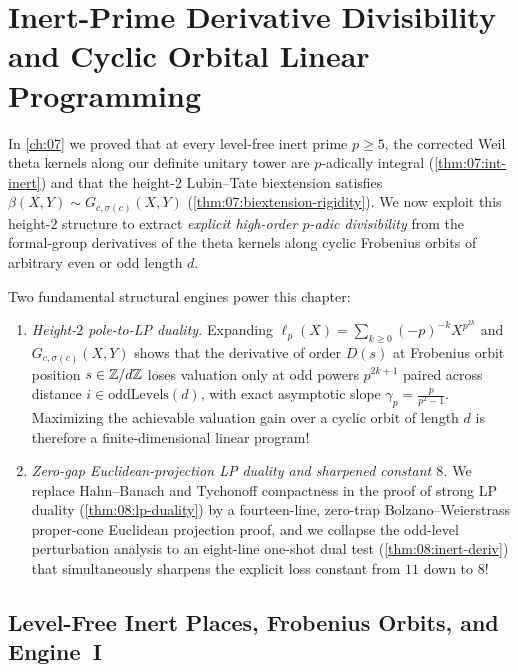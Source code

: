 \chapter{Inert-Prime Derivative Divisibility and Cyclic Orbital Linear Programming}
\label{ch:08}

In \cref{ch:07} we proved that at every level-free inert prime $p \ge 5$, the corrected Weil theta kernels along our definite unitary tower are $p$-adically integral (\cref{thm:07:int-inert}) and that the height-$2$ Lubin--Tate biextension satisfies $\beta(X, Y) \sim G_{c, \sigma(c)}(X, Y)$ (\cref{thm:07:biextension-rigidity}). We now exploit this height-$2$ structure to extract \emph{explicit high-order $p$-adic divisibility} from the formal-group derivatives of the theta kernels along cyclic Frobenius orbits of arbitrary even or odd length $d$.

Two fundamental structural engines power this chapter:
\begin{enumerate}[label=(\roman*)]
\item \emph{Height-$2$ pole-to-LP duality.} Expanding $\ell_p(X) = \sum_{k \ge 0} (-p)^{-k} X^{p^{2k}}$ and $G_{c,\sigma(c)}(X, Y)$ shows that the derivative of order $D(s)$ at Frobenius orbit position $s \in \mathbb{Z}/d\mathbb{Z}$ loses valuation only at odd powers $p^{2k+1}$ paired across distance $i \in \mathrm{oddLevels}(d)$, with exact asymptotic slope $\gamma_p = \frac{p}{p^2 - 1}$. Maximizing the achievable valuation gain over a cyclic orbit of length $d$ is therefore a finite-dimensional linear program!
\item \emph{Zero-gap Euclidean-projection LP duality and sharpened constant $8$.} We replace Hahn--Banach and Tychonoff compactness in the proof of strong LP duality (\cref{thm:08:lp-duality}) by a fourteen-line, zero-trap Bolzano--Weierstrass proper-cone Euclidean projection proof, and we collapse the odd-level perturbation analysis to an eight-line one-shot dual test (\cref{thm:08:inert-deriv}) that simultaneously sharpens the explicit loss constant from $11$ down to $8$!
\end{enumerate}

\section{Level-Free Inert Places, Frobenius Orbits, and Engine~I}
\label{sec:08:engine-one}

